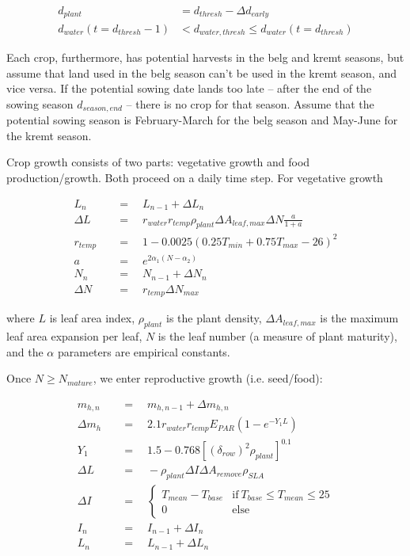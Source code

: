 \documentclass[letter,12pt]{article}
\begin{document}
\begin{align}
d_{plant} &= d_{thresh} - \Delta d_{early} \\
d_{water} \left(t = d_{thresh} - 1 \right)& < d_{water,thresh} \leq d_{water} \left(t = d_{thresh} \right)
\end{align}

Each crop, furthermore, has potential harvests in the belg and kremt seasons, but assume that land used in the belg season can't be used in the kremt season, and vice versa.  If the potential sowing date lands too late -- after the end of the sowing season $d_{season,end}$ -- there is no crop for that season.  Assume that the potential sowing season is February-March for the belg season and May-June for the kremt season.

Crop growth consists of two parts: vegetative growth and food production/growth.  Both proceed on a daily time step.  For vegetative growth

\begin{align}
L_n \quad &= \quad  L_{n-1} + \Delta L_n \\
\Delta L \quad &= \quad  r_{water} r_{temp} \rho_{plant} \Delta A_{leaf,max} \Delta N \frac{a}{1+a} \\
r_{temp} \quad &= \quad  1 - 0.0025 \left(0.25 T_{min} + 0.75 T_{max} - 26 \right)^2 \\
a \quad &= \quad  e^{2\alpha_1 \left(N-\alpha_2\right)} \\
N_n \quad &= \quad  N_{n-1} + \Delta N_n \\
\Delta N \quad &= \quad  r_{temp} \Delta N_{max}
\end{align}

\noindent where $L$ is leaf area index, $\rho_{plant}$ is the plant density, $\Delta A_{leaf, max}$ is the maximum leaf area expansion per leaf, $N$ is the leaf number (a measure of plant maturity), and the $\alpha$ parameters are empirical constants.

Once $N \geq N_{mature}$, we enter reproductive growth (i.e. seed/food):

\begin{align}
m_{h,n} \quad &= \quad   m_{h,n-1} + \Delta m_{h,n} \\
\Delta m_h \quad &= \quad   2.1 r_{water} r_{temp} E_{PAR} \left( 1 - e^{-Y_1 L}\right) \\
Y_1 \quad &= \quad   1.5 - 0.768 \left[ \left(\delta_{row}\right)^2 \rho_{plant}\right]^{0.1} \\
\Delta L \quad &= \quad   - \rho_{plant} \Delta I \Delta A_{remove} \rho_{SLA} \\
\Delta I \quad &= \quad   \left\{ \begin{array}{cc}
T_{mean} - T_{base} 		& \text{if} \ T_{base} \leq T_{mean} \leq 25 \\
0												&\text{else}
\end{array}\right. \\
I_n \quad &= \quad   I_{n-1} + \Delta I_n \\
L_n \quad &= \quad   L_{n-1} + \Delta L_n
\end{align}
\end{document}
